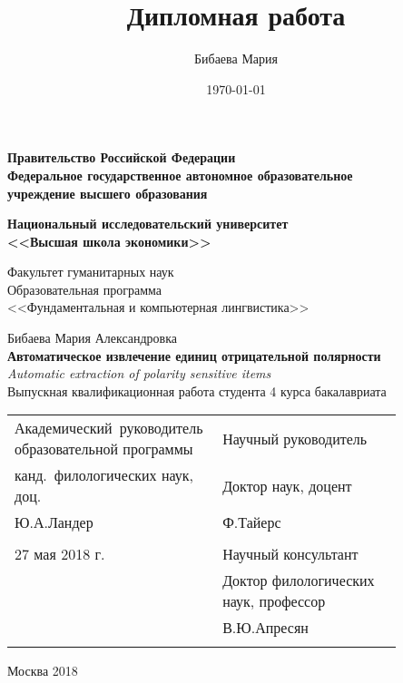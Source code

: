 \documentclass[a4paper,12pt]{article}
\author{Бибаева Мария}
\title{Дипломная работа}
\date{\today}
\begin{document}
	
	\newpage
	\thispagestyle{empty}
	\begin{center}
		\textbf{Правительство Российской Федерации \\
			Федеральное государственное автономное образовательное \\
			учреждение высшего образования}
		\vspace{1cm}
		
		\textbf{Национальный исследовательский университет \\ <<Высшая школа экономики>>}
	\end{center}
	
	\vspace{1cm}
	\begin{flushright}
		\noindent
		Факультет гуманитарных наук \\
		Образовательная программа \\
		<<Фундаментальная и компьютерная лингвистика>>
	\end{flushright}
	
	\begin{center}
		Бибаева Мария Александровка \\
		\vspace{2ex}
		\textbf{Автоматическое извлечение единиц отрицательной полярности} \\
		\textit{Automatic extraction of polarity sensitive items}\\
		\vspace{3ex}
		Выпускная квалификационная работа студента 4 курса бакалавриата 
	\end{center}
	\vspace{3ex}
	\begin{tabular}{p{0.4\linewidth}p{0.45\linewidth}}
		Академический~руководитель образовательной программы & Научный руководитель \\
		канд.~филологических наук, доц. & Доктор наук, доцент\\
		Ю.А.Ландер & Ф.Тайерс \\
		& \\ 
		27 мая 2018 г. & Научный консультант \\
		& Доктор филологических наук, профессор\\
		& В.Ю.Апресян\\
		& \\ 
	\end{tabular}
	
	\begin{center}
		Москва 2018
	\end{center}
	
\end{document}

